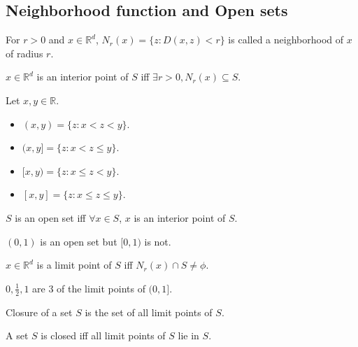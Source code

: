 \subsection{Neighborhood function and Open sets}

\begin{definition} For $r > 0$ and $x \in \mathbb{R}^d$, $N_r(x) = \{z: D(x, z) < r\}$
is called a neighborhood of $x$ of radius $r$. \end{definition}

\begin{definition} $x \in \mathbb{R}^d$ is an interior point of $S$ iff
$\exists r > 0, N_r(x) \subseteq S$. \end{definition}

\begin{definition}Let $x, y \in \mathbb{R}$.\begin{itemize}
\item $(x, y) = \{z: x < z < y\}$.
\item $(x, y] = \{z: x < z \le y\}$.
\item $[x, y) = \{z: x \le z < y\}$.
\item $[x, y] = \{z: x \le z \le y\}$.
\end{itemize}\end{definition}

\begin{definition} $S$ is an open set iff $\forall x \in S$,
$x$ is an interior point of $S$. \end{definition}

\begin{example} $(0, 1)$ is an open set but $[0, 1)$ is not. \end{example}

\begin{definition} $x \in \mathbb{R}^d$ is a limit point of $S$ iff
$N_r(x) \cap S \neq \phi$. \end{definition}

\begin{example} $0, \frac{1}{2}, 1$ are 3 of the limit points of $(0, 1]$. \end{example}

\begin{definition} Closure of a set $S$ is the set of all limit points of $S$. \end{definition}

\begin{definition} A set $S$ is closed iff all limit points of $S$ lie in $S$. \end{definition}

